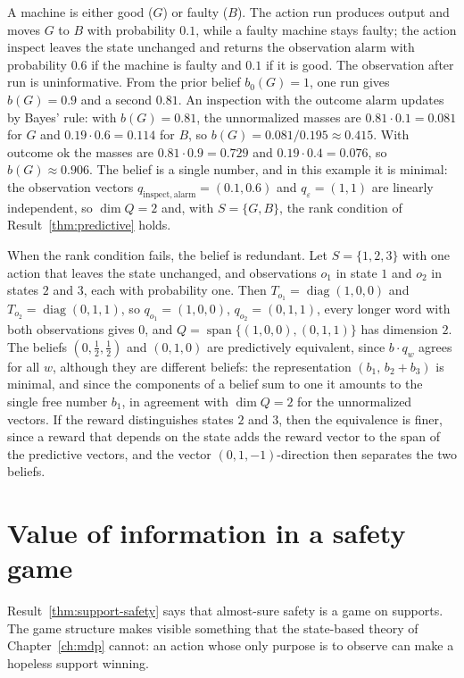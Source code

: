 A machine is either good ($G$) or faulty ($B$). The action $\mathrm{run}$ produces output and moves $G$ to $B$ with probability $0.1$, while a faulty machine stays faulty; the action $\mathrm{inspect}$ leaves the state unchanged and returns the observation $\mathrm{alarm}$ with probability $0.6$ if the machine is faulty and $0.1$ if it is good. The observation after $\mathrm{run}$ is uninformative. From the prior belief $b_0(G)=1$, one run gives $b(G)=0.9$ and a second $0.81$. An inspection with the outcome $\mathrm{alarm}$ updates by Bayes' rule: with $b(G)=0.81$, the unnormalized masses are $0.81\cdot0.1=0.081$ for $G$ and $0.19\cdot0.6=0.114$ for $B$, so $b(G)=0.081/0.195\approx0.415$. With outcome $\mathrm{ok}$ the masses are $0.81\cdot0.9=0.729$ and $0.19\cdot0.4=0.076$, so $b(G)\approx0.906$. The belief is a single number, and in this example it is minimal: the observation vectors $q_{\mathrm{inspect},\mathrm{alarm}}=(0.1,0.6)$ and $q_\varepsilon=(1,1)$ are linearly independent, so $\dim Q=2$ and, with $S=\{G,B\}$, the rank condition of Result~\ref{thm:predictive} holds.

When the rank condition fails, the belief is redundant. Let $S=\{1,2,3\}$ with one action that leaves the state unchanged, and observations $o_1$ in state $1$ and $o_2$ in states $2$ and $3$, each with probability one. Then $T_{o_1}=\operatorname{diag}(1,0,0)$ and $T_{o_2}=\operatorname{diag}(0,1,1)$, so $q_{o_1}=(1,0,0)$, $q_{o_2}=(0,1,1)$, every longer word with both observations gives $0$, and $Q=\operatorname{span}\{(1,0,0),(0,1,1)\}$ has dimension $2$. The beliefs $(0,\tfrac12,\tfrac12)$ and $(0,1,0)$ are predictively equivalent, since $b\cdot q_w$ agrees for all $w$, although they are different beliefs: the representation $(b_1,\,b_2+b_3)$ is minimal, and since the components of a belief sum to one it amounts to the single free number $b_1$, in agreement with $\dim Q=2$ for the unnormalized vectors. If the reward distinguishes states $2$ and $3$, then the equivalence is finer, since a reward that depends on the state adds the reward vector to the span of the predictive vectors, and the vector $(0,1,-1)$-direction then separates the two beliefs.

\section{Value of information in a safety game}\label{sec:voi}

Result~\ref{thm:support-safety} says that almost-sure safety is a game on supports. The game structure makes visible something that the state-based theory of Chapter~\ref{ch:mdp} cannot: an action whose only purpose is to observe can make a hopeless support winning.

